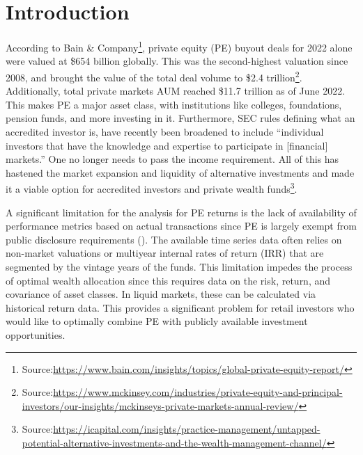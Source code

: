 \documentclass[11pt]{article}
\begin{document}
\section{Introduction} 
\label{sec:introduction}
According to Bain \& Company\footnote{Source:\href{https://www.bain.com/insights/topics/global-private-equity-report/}{https://www.bain.com/insights/topics/global-private-equity-report/}}, private equity (PE) buyout deals for 2022 alone were valued at \$654 billion globally. This was the second-highest valuation since 2008, and brought the value of the total deal volume to \$2.4 trillion\footnote{Source:\href{https://www.mckinsey.com/industries/private-equity-and-principal-investors/our-insights/mckinseys-private-markets-annual-review/}{https://www.mckinsey.com/industries/private-equity-and-principal-investors/our-insights/mckinseys-private-markets-annual-review/}}. Additionally, total private markets AUM reached \$11.7 trillion as of June 2022. This makes PE a major asset class, with institutions like colleges, foundations, pension funds, and more investing in it. Furthermore, SEC rules defining what an accredited investor is, have recently been broadened to include ``individual investors that have the knowledge and expertise to participate in [financial] markets.'' One no longer needs to pass the income requirement. All of this has hastened the market expansion and liquidity of alternative investments and made it a viable option for accredited investors and private wealth funds\footnote{Source:\href{https://icapital.com/insights/practice-management/untapped-potential-alternative-investments-and-the-wealth-management-channel/}{https://icapital.com/insights/practice-management/untapped-potential-alternative-investments-and-the-wealth-management-channel/}}.

A significant limitation for the analysis for PE returns is the lack of availability of performance metrics based on actual transactions since PE is largely exempt from public disclosure requirements (\cite{Kaplan2005}). The available time series data often relies on non-market valuations or multiyear internal rates of return (IRR) that are segmented by the vintage years of the funds. This limitation impedes the process of optimal wealth allocation since this requires data on the risk, return, and covariance of asset classes. In liquid markets, these can be calculated via historical return data. This provides a significant problem for retail investors who would like to optimally combine PE with publicly available investment opportunities. 
\end{document}
